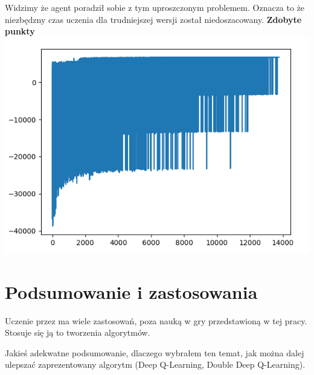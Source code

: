 \documentclass[a4paper,12pt]{article}
\begin{document}
Widzimy że agent poradził sobie z tym uproszczonym problemem. Oznacza to że niezbędzny czas uczenia dla trudniejszej wersji został niedoszacowany. \newline \newline
\textbf{\Large{Zdobyte punkty}} \newline
\includegraphics[scale=0.9]{testy/wykres3.png}
\newline \newline




\section{Podsumowanie i zastosowania}

Uczenie przez ma wiele zastosowań, poza nauką w gry przedstawioną w tej pracy. Stosuje się ją to tworzenia algorytmów.

 Jakieś adekwatne podsumowanie, dlaczego wybrałem ten temat, jak można dalej ulepszać zaprezentowany algorytm (Deep Q-Learning, Double Deep Q-Learning).
\end{document}
